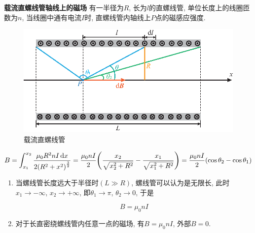 \begin{example}
	\textbf{载流直螺线管轴线上的磁场} \quad 有一半径为$R$, 长为$l$的直螺线管, 单位长度上的线圈匝数为$n$, 当线圈中通有电流$I$时, 直螺线管内轴线上$P$点的磁感应强度. 
	
	\begin{figure}[H]
		\centering
		\includegraphics[scale=0.7]{C8-fig5.eps}
		\caption{载流直螺线管}
		\label{C8-fig5}
	\end{figure}
	
	\begin{solution}
		
		\begin{equation*}
			B = \int_{x_1}^{x_2} \dfrac{\mu_0 R^2 n I \dd{x}}{2 \qty(R^2 + x^2)^{\frac{3}{2}}} = \dfrac{\mu_0 n I}{2} \qty(\dfrac{x_2}{\sqrt{x_2^2 + R^2}} - \dfrac{x_1}{\sqrt{x_1^2 + R^2}}) = \dfrac{\mu_0 n I}{2} \qty(\cos \theta_2 - \cos \theta_1)
		\end{equation*}
		
		\begin{enumerate}[itemindent=1em]
			
			\item 当螺线管长度远大于半径时$(L \gg R)$, 螺线管可以认为是无限长, 此时$x_1 \to - \infty$, $x_2 \to + \infty$, 即$\theta_1 \to \pi$, $\theta_2 \to 0$, 于是
			
			\begin{equation*}
				B = \mu_0 n I
			\end{equation*}
			
			\item 对于长直密绕螺线管内任意一点的磁场, 有$B = \mu_0 n I$, 外部$B = 0$.
			
		\end{enumerate}
		
	\end{solution}

\end{example}

